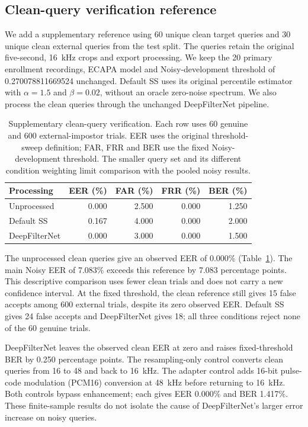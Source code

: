 \subsection{Clean-query verification reference}
We add a supplementary reference using 60 unique clean target queries and 30 unique clean external queries from the test split. The queries retain the original five-second, 16~kHz crops and export processing. We keep the 20 primary enrollment recordings, ECAPA model and Noisy-development threshold of 0.270078811669524 unchanged. Default SS uses its original percentile estimator with $\alpha=1.5$ and $\beta=0.02$, without an oracle zero-noise spectrum. We also process the clean queries through the unchanged DeepFilterNet pipeline.

\begin{table}[t]
\caption{Supplementary clean-query verification. Each row uses 60 genuine and 600 external-impostor trials. EER uses the original threshold-sweep definition; FAR, FRR and BER use the fixed Noisy-development threshold. The smaller query set and its different condition weighting limit comparison with the pooled noisy results.}
\label{tab:cleanquery}
\centering\small
\setlength{\tabcolsep}{3pt}
\begin{tabular}{lrrrr}
\toprule
Processing & EER (\%) & FAR (\%) & FRR (\%) & BER (\%)\\
\midrule
Unprocessed & 0.000 & 2.500 & 0.000 & 1.250\\
Default SS & 0.167 & 4.000 & 0.000 & 2.000\\
DeepFilterNet & 0.000 & 3.000 & 0.000 & 1.500\\
\bottomrule
\end{tabular}
\end{table}

The unprocessed clean queries give an observed EER of 0.000\% (Table~\ref{tab:cleanquery}). The main Noisy EER of 7.083\% exceeds this reference by 7.083 percentage points. This descriptive comparison uses fewer clean trials and does not carry a new confidence interval. At the fixed threshold, the clean reference still gives 15 false accepts among 600 external trials, despite its zero observed EER. Default SS gives 24 false accepts and DeepFilterNet gives 18; all three conditions reject none of the 60 genuine trials.

DeepFilterNet leaves the observed clean EER at zero and raises fixed-threshold BER by 0.250 percentage points. The resampling-only control converts clean queries from 16 to 48 and back to 16~kHz. The adapter control adds 16-bit pulse-code modulation (PCM16) conversion at 48~kHz before returning to 16~kHz. Both controls bypass enhancement; each gives EER 0.000\% and BER 1.417\%. These finite-sample results do not isolate the cause of DeepFilterNet's larger error increase on noisy queries.
